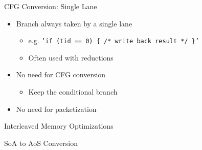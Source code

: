
\begin{frame}{CFG Conversion: Single Lane}

\begin{itemize}
    \item Branch always taken by a single lane
    \begin{itemize}
        \item e.g. \texttt{'if (tid == 0) \{ /* write back result */ \}'}
        \item Often used with reductions
    \end{itemize}
    \item No need for CFG conversion
    \begin{itemize}
        \item Keep the conditional branch
    \end{itemize}
    \item No need for packetization
\end{itemize}

\end{frame}


\begin{frame}{Interleaved Memory Optimizations}

\end{frame}


\begin{frame}{SoA to AoS Conversion}

\end{frame}
